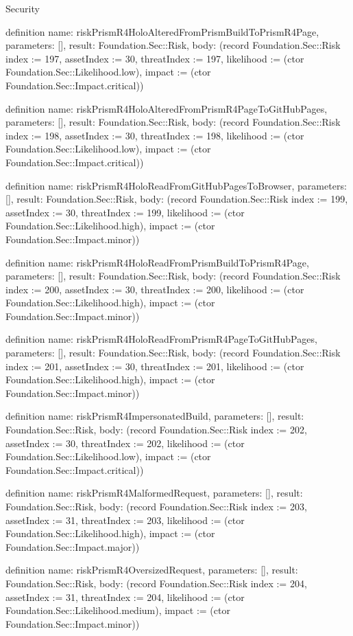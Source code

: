 \begin{lexlean}{Security}
\begin{semanticmodule}
definition{
  name: riskPrismR4HoloAlteredFromPrismBuildToPrismR4Page,
  parameters: [],
  result: Foundation.Sec::Risk,
  body: (record Foundation.Sec::Risk {index := 197, assetIndex := 30, threatIndex := 197, likelihood := (ctor Foundation.Sec::Likelihood.low), impact := (ctor Foundation.Sec::Impact.critical)})
}

definition{
  name: riskPrismR4HoloAlteredFromPrismR4PageToGitHubPages,
  parameters: [],
  result: Foundation.Sec::Risk,
  body: (record Foundation.Sec::Risk {index := 198, assetIndex := 30, threatIndex := 198, likelihood := (ctor Foundation.Sec::Likelihood.low), impact := (ctor Foundation.Sec::Impact.critical)})
}

definition{
  name: riskPrismR4HoloReadFromGitHubPagesToBrowser,
  parameters: [],
  result: Foundation.Sec::Risk,
  body: (record Foundation.Sec::Risk {index := 199, assetIndex := 30, threatIndex := 199, likelihood := (ctor Foundation.Sec::Likelihood.high), impact := (ctor Foundation.Sec::Impact.minor)})
}

definition{
  name: riskPrismR4HoloReadFromPrismBuildToPrismR4Page,
  parameters: [],
  result: Foundation.Sec::Risk,
  body: (record Foundation.Sec::Risk {index := 200, assetIndex := 30, threatIndex := 200, likelihood := (ctor Foundation.Sec::Likelihood.high), impact := (ctor Foundation.Sec::Impact.minor)})
}

definition{
  name: riskPrismR4HoloReadFromPrismR4PageToGitHubPages,
  parameters: [],
  result: Foundation.Sec::Risk,
  body: (record Foundation.Sec::Risk {index := 201, assetIndex := 30, threatIndex := 201, likelihood := (ctor Foundation.Sec::Likelihood.high), impact := (ctor Foundation.Sec::Impact.minor)})
}

definition{
  name: riskPrismR4ImpersonatedBuild,
  parameters: [],
  result: Foundation.Sec::Risk,
  body: (record Foundation.Sec::Risk {index := 202, assetIndex := 30, threatIndex := 202, likelihood := (ctor Foundation.Sec::Likelihood.low), impact := (ctor Foundation.Sec::Impact.critical)})
}

definition{
  name: riskPrismR4MalformedRequest,
  parameters: [],
  result: Foundation.Sec::Risk,
  body: (record Foundation.Sec::Risk {index := 203, assetIndex := 31, threatIndex := 203, likelihood := (ctor Foundation.Sec::Likelihood.high), impact := (ctor Foundation.Sec::Impact.major)})
}

definition{
  name: riskPrismR4OversizedRequest,
  parameters: [],
  result: Foundation.Sec::Risk,
  body: (record Foundation.Sec::Risk {index := 204, assetIndex := 31, threatIndex := 204, likelihood := (ctor Foundation.Sec::Likelihood.medium), impact := (ctor Foundation.Sec::Impact.minor)})
}


\end{semanticmodule}
\end{lexlean}
